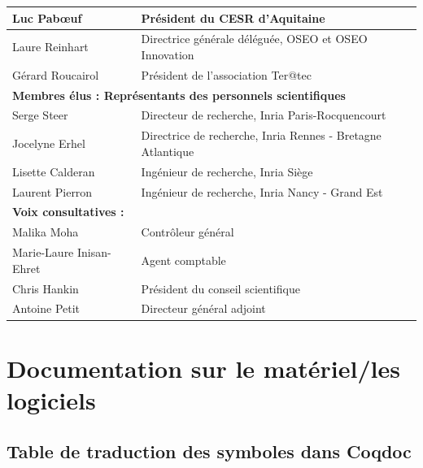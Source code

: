\begin{tabular}{|l|p{8cm}|}
        \hline
        Luc Pabœuf & Président du CESR d’Aquitaine \\
        \hline
        Laure Reinhart & Directrice générale déléguée, OSEO et OSEO Innovation \\
        \hline
        Gérard Roucairol & Président de l’association Ter@tec \\
        \hline
        \multicolumn{2}{l}{\textbf{Membres élus : Représentants des personnels scientifiques}} \\
        \hline
        Serge Steer & Directeur de recherche, Inria Paris-Rocquencourt \\
        \hline
        Jocelyne Erhel & Directrice de recherche, Inria Rennes - Bretagne Atlantique \\
        \hline
        Lisette Calderan & Ingénieur de recherche, Inria Siège \\
        \hline
        Laurent Pierron & Ingénieur de recherche, Inria Nancy - Grand Est \\
        \hline
        \multicolumn{2}{l}{\textbf{Voix consultatives :}} \\
        \hline
        Malika Moha & Contrôleur général \\
        \hline
        Marie-Laure Inisan-Ehret & Agent comptable \\
        \hline
        Chris Hankin & Président du conseil scientifique \\
        \hline
        Antoine Petit & Directeur général adjoint \\
        \hline
    \end{tabular}
    \clearpage{}
  \section{Documentation sur le matériel/les logiciels}
  \subsection{Table de traduction des symboles dans Coqdoc}

